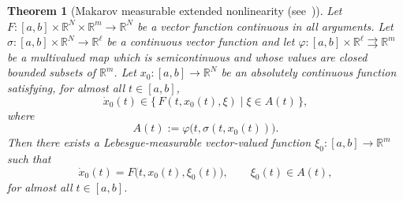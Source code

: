 \documentclass[journal]{IEEEtran}
\newtheorem{theorem}{Theorem}
\begin{document}
\begin{theorem}[Makarov measurable extended nonlinearity (see~{\cite[Thm.~1.7]{YLG}})]\label{thm:makarov}
Let $F:[a,b]\times\mathbb{R}^N\times\mathbb{R}^m\to\mathbb{R}^N$ be a
vector function continuous in all arguments.
Let $\sigma:[a,b]\times\mathbb{R}^N\to\mathbb{R}^\ell$ be a continuous
vector function and let $\varphi:[a,b]\times\mathbb{R}^\ell
\rightrightarrows\mathbb{R}^m$ be a multivalued map which is
semicontinuous and whose values are closed bounded subsets of
$\mathbb{R}^m$.
Let $x_0:[a,b]\to\mathbb{R}^N$ be an absolutely continuous function
satisfying, for almost all $t\in[a,b]$,
\begin{equation}\label{eq:makarov-incl}
   \dot x_0(t) \in \{\,F(t,x_0(t),\xi)\;|\; \xi\in A(t)\,\},
\end{equation}
where
\[
   A(t) := \varphi\bigl(t,\sigma(t,x_0(t))\bigr).
\]
Then there exists a Lebesgue-measurable vector-valued function
$\xi_0:[a,b]\to\mathbb{R}^m$ such that
\begin{equation}\label{eq:makarov-realization}
   \dot x_0(t) = F\bigl(t,x_0(t),\xi_0(t)\bigr), \qquad
   \xi_0(t)\in A(t),
\end{equation}
for almost all $t\in[a,b]$.
\end{theorem}
\end{document}
